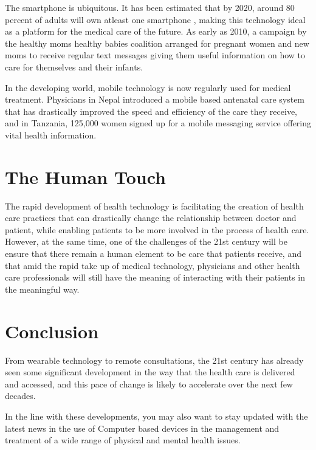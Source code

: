\documentclass[12pt]{article}
\begin{document}
The smartphone is ubiquitous. It has been estimated that by 2020, around 80 percent of adults will own atleast one smartphone , making this technology ideal as a platform for the medical care of the future. As early as 2010, a campaign by the healthy moms healthy babies coalition arranged for pregnant women and new moms to receive regular text messages giving them useful information on how to care for themselves and their infants.

In the developing world, mobile technology is now regularly used for medical treatment. Physicians in Nepal introduced a mobile based antenatal care system that has drastically improved the speed and efficiency    of the care they receive, and in Tanzania, 125,000 women signed up for a mobile messaging service offering vital health information.

\section{The Human Touch}

The rapid development of health technology is facilitating the creation of health care practices that can drastically change the relationship between doctor and patient, while enabling patients to be more involved in the process of health care. However, at the same time, one of the challenges of the 21st century will be ensure that there remain a human element to be care that patients receive, and that amid the rapid take up of medical technology, physicians and other health care professionals will still have the meaning of interacting with their patients in the meaningful way. 

\section{Conclusion}

From wearable technology to remote consultations, the 21st century has already seen some significant development in the way that the health care is delivered and accessed, and this pace of change is likely to accelerate over the next few decades.

In the line with these developments, you may also want to stay updated with the latest news in the use of Computer based devices in the management and treatment of a wide range of physical and mental health issues.      
\end{document}
